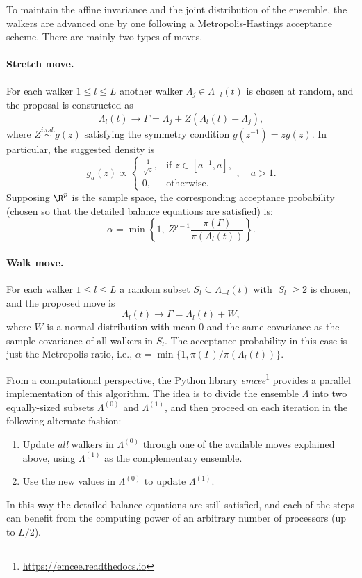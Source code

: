 To maintain the affine invariance and the joint distribution of the ensemble, the walkers are advanced one by one following a Metropolis-Hastings acceptance scheme. There are mainly two types of moves.

  \paragraph{Stretch move.} For each walker \(1\leq l \leq L\) another walker \(\Lambda_j \in \Lambda_{-l}(t)\) is chosen at random, and the proposal is constructed as
  \[
    \Lambda_l(t) \to \Gamma = \Lambda_j + Z(\Lambda_l(t) - \Lambda_j),
  \]
  where \(Z \stackrel{i.i.d.}{\sim} g(z)\) satisfying the symmetry condition \(g(z^{-1})=zg(z)\). In particular, the suggested density is
  \[
  g_a(z) \propto \begin{cases}
    \frac{1}{\sqrt{z}}, & \text{if } z \in [a^{-1}, a],\\
    0, & \text{otherwise.}
\end{cases}, \quad a > 1.
  \]
Supposing \(\R^p\) is the sample space, the corresponding acceptance probability (chosen so that the detailed balance equations are satisfied) is:
  \[
    \alpha = \min\left\{1, \ Z^{p-1}\frac{\pi(\Gamma)}{\pi(\Lambda_l(t))}\right\}.
  \]

  \setlength{\footskip}{60pt}

  \paragraph{Walk move.} For each walker \(1\leq l \leq L\) a random subset \(S_l \subseteq \Lambda_{-l}(t)\) with \(|S_l| \geq 2\) is chosen, and the proposed move is
\[
\Lambda_l(t) \to \Gamma = \Lambda_l(t) + W,
\]
where \(W\) is a normal distribution with mean \(0\) and the same covariance as the sample covariance of all walkers in \(S_l\). The acceptance probability in this case is just the Metropolis ratio, i.e., \(\alpha=\min\{1, \pi(\Gamma)/\pi(\Lambda_l(t))\}\).

\vspace*{.75em}

From a computational perspective, the Python library \textit{emcee}\footnote{\url{https://emcee.readthedocs.io}} \citep{foreman2013emcee} provides a parallel implementation of this algorithm. The idea is to divide the ensemble \(\Lambda\) into two equally-sized subsets \(\Lambda^{(0)}\) and \(\Lambda^{(1)}\), and then proceed on each iteration in the following alternate fashion:

\enlargethispage{2\baselineskip}

\begin{enumerate}[1.]
  \item Update \textit{all} walkers in \(\Lambda^{(0)}\) through one of the available moves explained above, using \(\Lambda^{(1)}\) as the complementary ensemble.
  \item Use the new values in \(\Lambda^{(0)}\) to update \(\Lambda^{(1)}\).
\end{enumerate}

In this way the detailed balance equations are still satisfied, and each of the steps can benefit from the computing power of an arbitrary number of processors (up to \(L/2\)).
